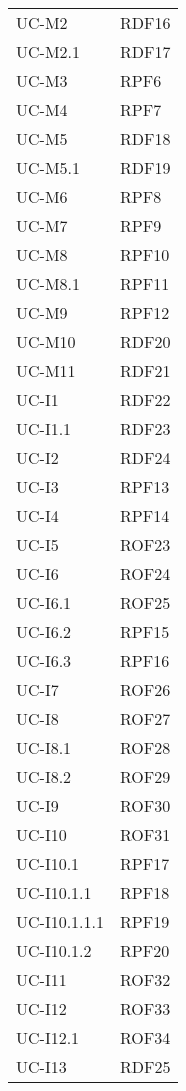 \begin{longtable}{| p{5cm} | p{5cm} |}
		UC-M2 & RDF16 \\
		\rowcolor{LightGray}
		UC-M2.1 & RDF17 \\
		UC-M3 & RPF6 \\
		\rowcolor{LightGray}
		UC-M4 & RPF7\\
		UC-M5 & RDF18 \\
		\rowcolor{LightGray}
		UC-M5.1 & RDF19 \\
		UC-M6 & RPF8 \\
		\rowcolor{LightGray}
		UC-M7 & RPF9 \\
		UC-M8 & RPF10\\
		\rowcolor{LightGray}
		UC-M8.1 & RPF11\\
		UC-M9 & RPF12\\
		\rowcolor{LightGray}
		UC-M10 & RDF20\\
		UC-M11 & RDF21\\
		\rowcolor{LightGray}
		UC-I1 & RDF22 \\
		UC-I1.1 & RDF23 \\
		\rowcolor{LightGray}
		UC-I2 & RDF24 \\
		UC-I3 & RPF13 \\
		\rowcolor{LightGray}
		UC-I4 & RPF14 \\
		UC-I5 & ROF23\\
		\rowcolor{LightGray}
		UC-I6 & ROF24 \\
		UC-I6.1 & ROF25 \\
		\rowcolor{LightGray}
		UC-I6.2 & RPF15 \\
		UC-I6.3 & RPF16 \\
		\rowcolor{LightGray}
		UC-I7 & ROF26\\
		UC-I8 & ROF27 \\
		\rowcolor{LightGray}
		UC-I8.1 & ROF28 \\
		UC-I8.2 & ROF29 \\
		\rowcolor{LightGray}
		UC-I9 & ROF30 \\
		UC-I10 & ROF31 \\
		\rowcolor{LightGray}
		UC-I10.1 & RPF17 \\
		UC-I10.1.1 & RPF18\\
		\rowcolor{LightGray}
		UC-I10.1.1.1 & RPF19 \\
		UC-I10.1.2 & RPF20 \\
		\rowcolor{LightGray}
		UC-I11 & ROF32 \\
		UC-I12 & ROF33 \\
		\rowcolor{LightGray}
		UC-I12.1 & ROF34 \\
		UC-I13 & RDF25 \\

\end{longtable}
